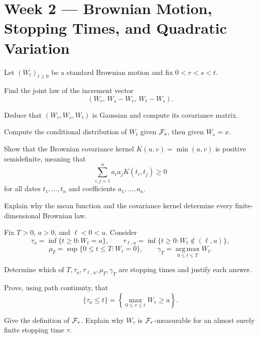 
\section{Week 2 --- Brownian Motion, Stopping Times, and Quadratic Variation}

\ifIncludeCore

\setcounter{exercise}{0}
\begin{exercise}
Let \((W_t)_{t\geq0}\) be a standard Brownian motion and fix
\(0<r<s<t\).
\begin{exparts}
  \item Find the joint law of the increment vector
  \[
  (W_r,\,W_s-W_r,\,W_t-W_s).
  \]
  \item Deduce that \((W_r,W_s,W_t)\) is Gaussian and compute its covariance
  matrix.
  \item Compute the conditional distribution of \(W_t\) given \(\mathcal F_s\),
  then given \(W_s=x\).
  \item Show that the Brownian covariance kernel
  \(K(u,v)=\min(u,v)\) is positive semidefinite, meaning that
  \[
  \sum_{i,j=1}^n a_i a_j K(t_i,t_j)\geq0
  \]
  for all dates \(t_1,\ldots,t_n\) and coefficients
  \(a_1,\ldots,a_n\).
  \item Explain why the mean function and the covariance kernel determine
  every finite-dimensional Brownian law.
\end{exparts}
\end{exercise}

\begin{exercise}
Fix \(T>0\), \(a>0\), and \(\ell<0<u\). Consider
\[
\tau_a=\inf\{t\geq0:W_t=a\},
\qquad
\tau_{\ell,u}=\inf\{t\geq0:W_t\notin(\ell,u)\},
\]
\[
\rho_T=\sup\{0\leq t\leq T:W_t=0\},
\qquad
\gamma_T=\operatorname*{arg\,max}_{0\leq t\leq T}W_t.
\]
\begin{exparts}
  \item Determine which of \(T,\tau_a,\tau_{\ell,u},\rho_T,\gamma_T\)
  are stopping times and justify each answer.
  \item Prove, using path continuity, that
  \[
  \{\tau_a\leq t\}
  =\left\{\max_{0\leq v\leq t}W_v\geq a\right\}.
  \]
  \item Give the definition of \(\mathcal F_\tau\). Explain why \(W_\tau\) is
  \(\mathcal F_\tau\)-measurable for an almost surely finite stopping time \(\tau\).
\end{exparts}
\end{exercise}

